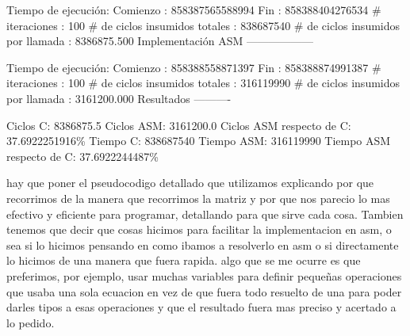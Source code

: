 \documentclass[10pt, a4paper]{article}
\begin{document}
\begin{itemize}
Tiempo de ejecución:\newline
  Comienzo                          : 858387565588994\newline
  Fin                               : 858388404276534\newline
  \# iteraciones                     : 100\newline
  \# de ciclos insumidos totales     : 838687540\newline
  \# de ciclos insumidos por llamada : 8386875.500\newline
\newline
Implementación ASM\newline
------------------

Tiempo de ejecución:\newline
  Comienzo                          : 858388558871397\newline
  Fin                               : 858388874991387\newline
  \# iteraciones                     : 100\newline
  \# de ciclos insumidos totales     : 316119990\newline
  \# de ciclos insumidos por llamada : 3161200.000\newline
\newline
Resultados\newline
----------

Ciclos C:                 8386875.5\newline
Ciclos ASM:               3161200.0\newline
Ciclos ASM respecto de C: 37.6922251916\%\newline
Tiempo C:                 838687540\newline
Tiempo ASM:               316119990\newline
Tiempo ASM respecto de C: 37.6922244487\%\newline


\end{itemize}

hay que poner el pseudocodigo detallado que utilizamos explicando por que recorrimos de la manera que recorrimos la matriz y por que nos parecio lo mas efectivo y eficiente para programar, detallando para que sirve cada cosa. Tambien tenemos que decir que cosas hicimos para facilitar la implementacion en asm, o sea si lo hicimos pensando en como ibamos a resolverlo en asm o si directamente lo hicimos de una manera que fuera rapida. algo que se me ocurre es que preferimos, por ejemplo, usar muchas variables para definir pequeñas operaciones que usaba una sola ecuacion en vez de que fuera todo resuelto de una para poder darles tipos a esas operaciones y que el resultado fuera mas preciso y acertado a lo pedido.\newline
\end{document}
